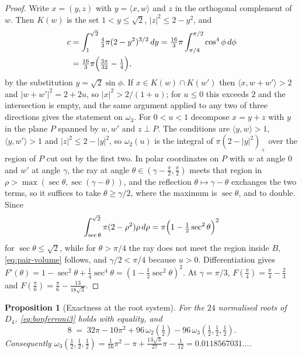 \documentclass[11pt,reqno]{amsart}
\renewcommand{\_}{\origunderscore\allowbreak}
\numberwithin{equation}{section}
\theoremstyle{plain}
\newtheorem{prop}[thm]{Proposition}
\theoremstyle{definition}
\theoremstyle{remark}
\begin{document}
\begin{proof}
Write $x=(y,z)$ with $y=\langle x,w\rangle$ and $z$ in the orthogonal
complement of $w$. Then $K(w)$ is the set $1<y\le\sqrt2$,
$|z|^2\le2-y^2$, and
\begin{align*}
  c&=\int_1^{\sqrt2}\tfrac43\pi(2-y^2)^{3/2}\,dy
  =\tfrac{16}3\pi\int_{\pi/4}^{\pi/2}\cos^4\phi\,d\phi\\
  &=\tfrac{16}3\pi\Bigl(\tfrac{3\pi}{32}-\tfrac14\Bigr),
\end{align*}
by the substitution $y=\sqrt2\sin\phi$. If $x\in K(w)\cap K(w')$ then
$\langle x,w+w'\rangle>2$ and $|w+w'|^2=2+2u$, so
$|x|^2>2/(1+u)$; for $u\le0$ this exceeds $2$ and the intersection is
empty, and the same argument applied to any two of three directions
gives the statement on $\omega_3$. For $0<u<1$ decompose $x=y+z$ with
$y$ in the plane $P$ spanned by $w,w'$ and $z\perp P$. The conditions are
$\langle y,w\rangle>1$, $\langle y,w'\rangle>1$ and $|z|^2\le2-|y|^2$,
so $\omega_2(u)$ is the integral of $\pi(2-|y|^2)_+$ over the region of
$P$ cut out by the first two. In polar coordinates on $P$ with $w$ at
angle $0$ and $w'$ at angle $\gamma$, the ray at angle
$\theta\in(\gamma-\tfrac\pi2,\tfrac\pi2)$ meets that region in
$\rho>\max(\sec\theta,\sec(\gamma-\theta))$, and the reflection
$\theta\mapsto\gamma-\theta$ exchanges the two terms, so it suffices to
take $\theta\ge\gamma/2$, where the maximum is $\sec\theta$, and to
double. Since
\[
  \int_{\sec\theta}^{\sqrt2}\pi(2-\rho^2)\rho\,d\rho
  =\pi\Bigl(1-\tfrac12\sec^2\theta\Bigr)^2
\]
for $\sec\theta\le\sqrt2$, while for $\theta>\pi/4$ the ray does not
meet the region inside $B$, \eqref{eq:pair-volume} follows, and $\gamma/2<\pi/4$
because $u>0$. Differentiation gives
$F'(\theta)=1-\sec^2\theta+\tfrac14\sec^4\theta=(1-\tfrac12\sec^2\theta)^2$.
At $\gamma=\pi/3$, $F(\tfrac\pi4)=\tfrac\pi4-\tfrac23$ and
$F(\tfrac\pi6)=\tfrac\pi6-\tfrac{13}{18\sqrt3}$.
\end{proof}

\begin{prop}[Exactness at the root system]\label{prop:m24-exact}
For the $24$ normalised roots of $D_4$, \eqref{eq:bonferroni3} holds with
equality, and
\begin{equation}\label{eq:m24-identity}
  8\;=\;32\pi-10\pi^2+96\,\omega_2(\tfrac12)-96\,\omega_3(\tfrac12,\tfrac12,\tfrac12).
\end{equation}
Consequently
$\omega_3(\tfrac12,\tfrac12,\tfrac12)=\tfrac1{16}\pi^2-\pi+\tfrac{13\sqrt3}{27}\pi-\tfrac1{12}
=0.0118567031\ldots$.
\end{prop}
\end{document}
